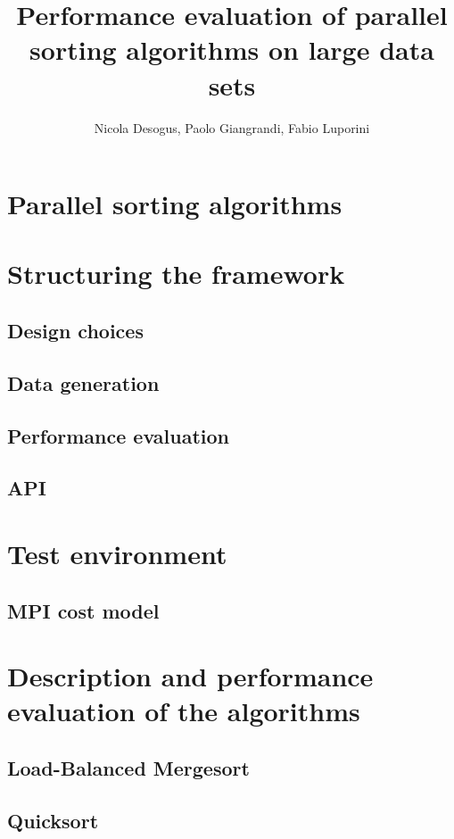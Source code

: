 \documentclass[a4paper,12pt,oneside,openright]{article}
\title{Performance evaluation of parallel sorting algorithms on large data sets}
\author{Nicola Desogus, Paolo Giangrandi, Fabio Luporini}
\begin{document}
\maketitle
\tableofcontents
\pagebreak



\section{Parallel sorting algorithms}

\section{Structuring the framework}
\subsection{Design choices}
\subsection{Data generation}
\subsection{Performance evaluation}
\subsection{API}

\section{Test environment}
\subsection{MPI cost model}

\pagebreak

\section{Description and performance evaluation of the algorithms}



\subsection{Load-Balanced Mergesort}
\subsection{Quicksort}
\end{document}
